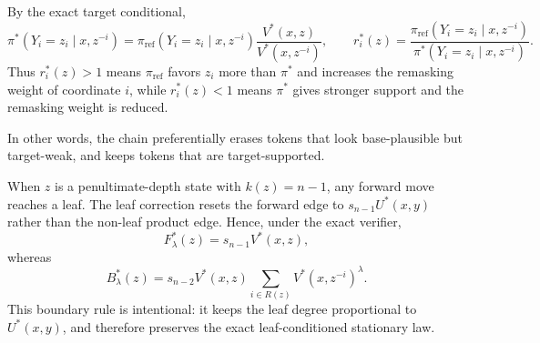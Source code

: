 \documentclass{article}
\numberwithin{theorem}{section}
\numberwithin{proposition}{section}
\numberwithin{corollary}{section}
\numberwithin{lemma}{section}
\numberwithin{conjecture}{section}
\numberwithin{remark}{section}
\numberwithin{definition}{section}
\numberwithin{assumption}{section}
\numberwithin{example}{section}
\providecommand{\base}{\pi_{\mathrm{ref}}}
\begin{document}
\begin{remark}
\label{rem:bg_reference_target_mismatch}
By the exact target conditional,
\begin{equation*}
    \pi^*(Y_i=z_i\mid x,z^{-i})
    =
    \base(Y_i=z_i\mid x,z^{-i})
    \frac{V^*(x,z)}{V^*(x,z^{-i})},
    \qquad
    r_i^*(z)
    =
    \frac{\base(Y_i=z_i\mid x,z^{-i})}
    {\pi^*(Y_i=z_i\mid x,z^{-i})}.
\end{equation*}
Thus $r_i^*(z)>1$ means $\base$ favors $z_i$ more than $\pi^*$ and increases
the remasking weight of coordinate $i$, while $r_i^*(z)<1$ means $\pi^*$ gives
stronger support and the remasking weight is reduced.

In other words, the chain preferentially erases tokens that look base-plausible
but target-weak, and keeps tokens that are target-supported.
\end{remark}

\begin{remark}
\label{rem:bg_leaf_boundary_directional_masses}
When $z$ is a penultimate-depth state with $k(z)=n-1$, any forward move reaches a leaf. The leaf correction resets the forward edge to $s_{n-1}U^*(x,y)$ rather than the non-leaf product edge. Hence, under the exact verifier,
\begin{equation*}
    F_\lambda^*(z)=s_{n-1}V^*(x,z),
\end{equation*}
whereas
\begin{equation*}
    B_\lambda^*(z)
    =
    s_{n-2}V^*(x,z)\sum_{i\in R(z)}V^*(x,z^{-i})^\lambda.
\end{equation*}
This boundary rule is intentional: it keeps the leaf degree proportional to $U^*(x,y)$, and therefore preserves the exact leaf-conditioned stationary law.
\end{remark}
\end{document}
